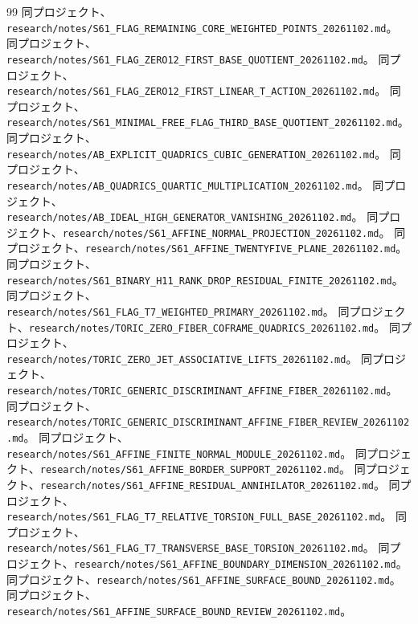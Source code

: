 \documentclass[11pt,a4paper]{ltjsarticle}
\theoremstyle{remark}
\begin{document}
\begin{thebibliography}{99}
 同プロジェクト、\nolinkurl{research/notes/S61_FLAG_REMAINING_CORE_WEIGHTED_POINTS_20261102.md}。
 同プロジェクト、\nolinkurl{research/notes/S61_FLAG_ZERO12_FIRST_BASE_QUOTIENT_20261102.md}。
 同プロジェクト、\nolinkurl{research/notes/S61_FLAG_ZERO12_FIRST_LINEAR_T_ACTION_20261102.md}。
 同プロジェクト、\nolinkurl{research/notes/S61_MINIMAL_FREE_FLAG_THIRD_BASE_QUOTIENT_20261102.md}。
 同プロジェクト、\nolinkurl{research/notes/AB_EXPLICIT_QUADRICS_CUBIC_GENERATION_20261102.md}。
 同プロジェクト、\nolinkurl{research/notes/AB_QUADRICS_QUARTIC_MULTIPLICATION_20261102.md}。
 同プロジェクト、\nolinkurl{research/notes/AB_IDEAL_HIGH_GENERATOR_VANISHING_20261102.md}。
 同プロジェクト、\nolinkurl{research/notes/S61_AFFINE_NORMAL_PROJECTION_20261102.md}。
 同プロジェクト、\nolinkurl{research/notes/S61_AFFINE_TWENTYFIVE_PLANE_20261102.md}。
 同プロジェクト、\nolinkurl{research/notes/S61_BINARY_H11_RANK_DROP_RESIDUAL_FINITE_20261102.md}。
 同プロジェクト、\nolinkurl{research/notes/S61_FLAG_T7_WEIGHTED_PRIMARY_20261102.md}。
 同プロジェクト、\nolinkurl{research/notes/TORIC_ZERO_FIBER_COFRAME_QUADRICS_20261102.md}。
 同プロジェクト、\nolinkurl{research/notes/TORIC_ZERO_JET_ASSOCIATIVE_LIFTS_20261102.md}。
 同プロジェクト、\nolinkurl{research/notes/TORIC_GENERIC_DISCRIMINANT_AFFINE_FIBER_20261102.md}。
 同プロジェクト、\nolinkurl{research/notes/TORIC_GENERIC_DISCRIMINANT_AFFINE_FIBER_REVIEW_20261102.md}。
 同プロジェクト、\nolinkurl{research/notes/S61_AFFINE_FINITE_NORMAL_MODULE_20261102.md}。
 同プロジェクト、\nolinkurl{research/notes/S61_AFFINE_BORDER_SUPPORT_20261102.md}。
 同プロジェクト、\nolinkurl{research/notes/S61_AFFINE_RESIDUAL_ANNIHILATOR_20261102.md}。
 同プロジェクト、\nolinkurl{research/notes/S61_FLAG_T7_RELATIVE_TORSION_FULL_BASE_20261102.md}。
 同プロジェクト、\nolinkurl{research/notes/S61_FLAG_T7_TRANSVERSE_BASE_TORSION_20261102.md}。
 同プロジェクト、\nolinkurl{research/notes/S61_AFFINE_BOUNDARY_DIMENSION_20261102.md}。
 同プロジェクト、\nolinkurl{research/notes/S61_AFFINE_SURFACE_BOUND_20261102.md}。
 同プロジェクト、\nolinkurl{research/notes/S61_AFFINE_SURFACE_BOUND_REVIEW_20261102.md}。

\end{thebibliography}
\end{document}
